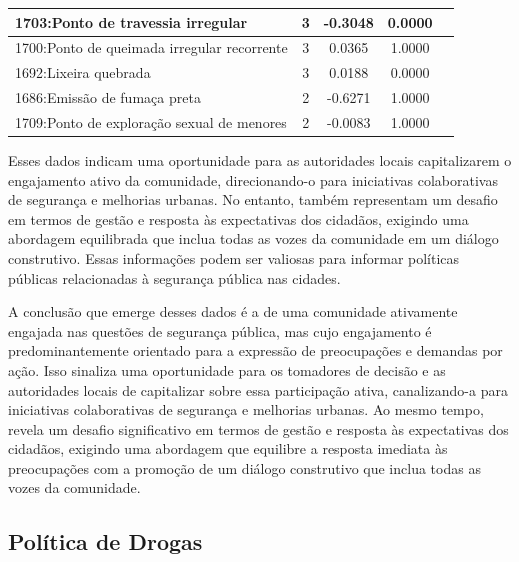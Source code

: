 \begin{table}[htbp]
\begin{tabular}{|l|c|c|c|c|}
		\hline
		1703:Ponto de travessia irregular           & 3                & -0.3048        & 0.0000           \\
		\hline
		1700:Ponto de queimada irregular recorrente & 3                & 0.0365         & 1.0000           \\
		\hline
		1692:Lixeira quebrada                       & 3                & 0.0188         & 0.0000           \\
		\hline
		1686:Emissão de fumaça preta                & 2                & -0.6271        & 1.0000           \\
		\hline
		1709:Ponto de exploração sexual de menores  & 2                & -0.0083        & 1.0000           \\
		\hline
	\end{tabular}
\end{table}

Esses dados indicam uma oportunidade para as autoridades locais capitalizarem o engajamento ativo da comunidade, direcionando-o para iniciativas colaborativas de segurança e melhorias urbanas. No entanto, também representam um desafio em termos de gestão e resposta às expectativas dos cidadãos, exigindo uma abordagem equilibrada que inclua todas as vozes da comunidade em um diálogo construtivo. Essas informações podem ser valiosas para informar políticas públicas relacionadas à segurança pública nas cidades.

A conclusão que emerge desses dados é a de uma comunidade ativamente engajada nas questões de segurança pública, mas cujo engajamento é predominantemente orientado para a expressão de preocupações e demandas por ação. Isso sinaliza uma oportunidade para os tomadores de decisão e as autoridades locais de capitalizar sobre essa participação ativa, canalizando-a para iniciativas colaborativas de segurança e melhorias urbanas. Ao mesmo tempo, revela um desafio significativo em termos de gestão e resposta às expectativas dos cidadãos, exigindo uma abordagem que equilibre a resposta imediata às preocupações com a promoção de um diálogo construtivo que inclua todas as vozes da comunidade.

\subsection{Política de Drogas}

